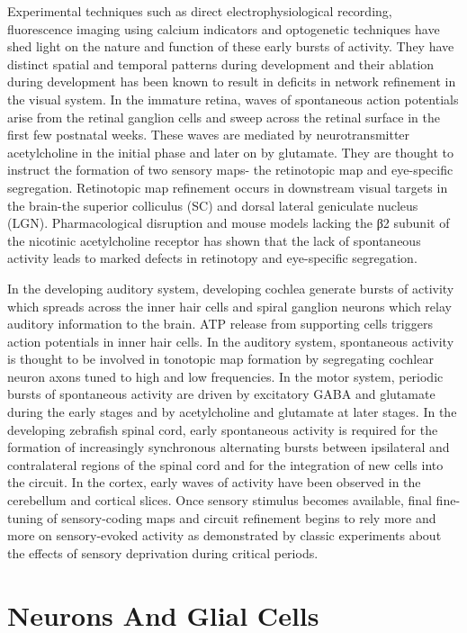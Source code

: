 Experimental techniques such as direct electrophysiological recording, fluorescence imaging using calcium indicators and optogenetic techniques have shed light on the nature and function of these early bursts of activity. They have distinct spatial and temporal patterns during development and their ablation during development has been known to result in deficits in network refinement in the visual system. In the immature retina, waves of spontaneous action potentials arise from the retinal ganglion cells and sweep across the retinal surface in the first few postnatal weeks. These waves are mediated by neurotransmitter acetylcholine in the initial phase and later on by glutamate. They are thought to instruct the formation of two sensory maps- the retinotopic map and eye-specific segregation. Retinotopic map refinement occurs in downstream visual targets in the brain-the superior colliculus (SC) and dorsal lateral geniculate nucleus (LGN). Pharmacological disruption and mouse models lacking the β2 subunit of the nicotinic acetylcholine receptor has shown that the lack of spontaneous activity leads to marked defects in retinotopy and eye-specific segregation.

In the developing auditory system, developing cochlea generate bursts of activity which spreads across the inner hair cells and spiral ganglion neurons which relay auditory information to the brain. ATP release from supporting cells triggers action potentials in inner hair cells. In the auditory system, spontaneous activity is thought to be involved in tonotopic map formation by segregating cochlear neuron axons tuned to high and low frequencies. In the motor system, periodic bursts of spontaneous activity are driven by excitatory GABA and glutamate during the early stages and by acetylcholine and glutamate at later stages. In the developing zebrafish spinal cord, early spontaneous activity is required for the formation of increasingly synchronous alternating bursts between ipsilateral and contralateral regions of the spinal cord and for the integration of new cells into the circuit. In the cortex, early waves of activity have been observed in the cerebellum and cortical slices. Once sensory stimulus becomes available, final fine-tuning of sensory-coding maps and circuit refinement begins to rely more and more on sensory-evoked activity as demonstrated by classic experiments about the effects of sensory deprivation during critical periods.

\hypertarget{neurons-and-glial-cells}{%
\chapter{Neurons And Glial Cells}\label{neurons-and-glial-cells}}

